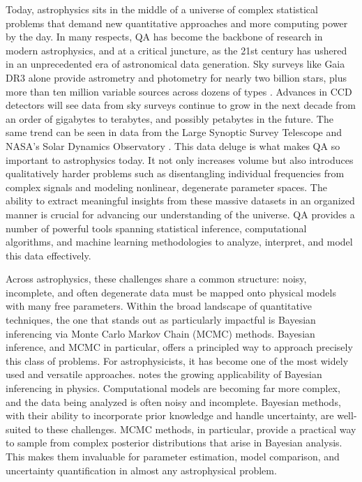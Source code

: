 \documentclass[manuscript,linenumbers,longauthor]{aastex631}
\begin{document}
Today, astrophysics sits in the middle of a universe of complex statistical problems that demand new quantitative approaches and more computing power by the day. In many respects, QA has become the backbone of research in modern astrophysics, and at a critical juncture, as the 21st century has ushered in an unprecedented era of astronomical data generation. Sky surveys like  Gaia DR3 alone provide astrometry and photometry for nearly two billion stars, plus more than ten million variable sources across dozens of types \citep{gaiacollaborationGaiaDataRelease2023}. Advances in CCD detectors will see data from sky surveys continue to grow in the next decade from an order of gigabytes to terabytes, and possibly petabytes in the future. The same trend can be seen in data from the Large Synoptic Survey Telescope and NASA's Solar Dynamics Observatory \citep{borneAstroinformatics21stCentury2009}. This data deluge is what makes QA so important to astrophysics today. It not only increases volume but also introduces qualitatively harder problems such as disentangling individual frequencies from complex signals and modeling nonlinear, degenerate parameter spaces. The ability to extract meaningful insights from these massive datasets in an organized manner is crucial for advancing our understanding of the universe. QA provides a number of powerful tools spanning statistical inference, computational algorithms, and machine learning methodologies to analyze, interpret, and model this data effectively.

Across astrophysics, these challenges share a common structure: noisy, incomplete, and often degenerate data must be mapped onto physical models with many free parameters. Within the broad landscape of quantitative techniques, the one that stands out as particularly impactful is Bayesian inferencing via Monte Carlo Markov Chain (MCMC) methods. Bayesian inference, and MCMC in particular, offers a principled way to approach precisely this class of problems. For astrophysicists, it has become one of the most widely used and versatile approaches. \citet{vontoussaintBayesianInferencePhysics2011} notes the growing applicability of Bayesian inferencing in physics. Computational models are becoming far more complex, and the data being analyzed is often noisy and incomplete. Bayesian methods, with their ability to incorporate prior knowledge and handle uncertainty, are well-suited to these challenges. MCMC methods, in particular, provide a practical way to sample from complex posterior distributions that arise in Bayesian analysis. This makes them invaluable for parameter estimation, model comparison, and uncertainty quantification in almost any astrophysical problem.
\end{document}
